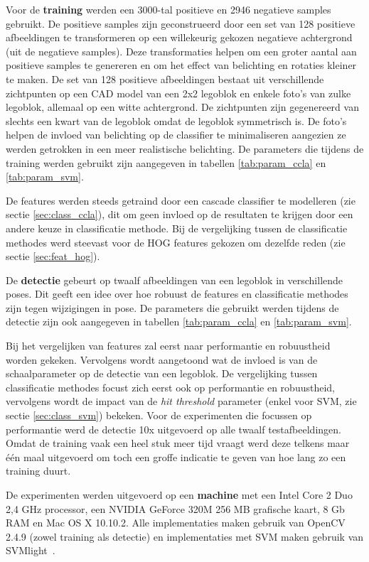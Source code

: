 Voor de \textbf{training} werden een 3000-tal positieve en 2946 negatieve samples gebruikt. De positieve samples zijn geconstrueerd door een set van 128 positieve afbeeldingen te transformeren op een willekeurig gekozen negatieve achtergrond (uit de negatieve samples). Deze transformaties helpen om een groter aantal aan positieve samples te genereren en om het effect van belichting en rotaties kleiner te maken. De set van 128 positieve afbeeldingen bestaat uit verschillende zichtpunten op een CAD model van een 2x2 legoblok en enkele foto's van zulke legoblok, allemaal op een witte achtergrond. De zichtpunten zijn gegenereerd van slechts een kwart van de legoblok omdat de legoblok symmetrisch is. De foto's helpen de invloed van belichting op de classifier te minimaliseren aangezien ze werden getrokken in een meer realistische belichting. De parameters die tijdens de training werden gebruikt zijn aangegeven in tabellen \ref{tab:param_ccla} en \ref{tab:param_svm}.

De features werden steeds getraind door een cascade classifier te modelleren (zie sectie \ref{sec:class_ccla}), dit om geen invloed op de resultaten te krijgen door een andere keuze in classificatie methode. Bij de vergelijking tussen de classificatie methodes werd steevast voor de HOG features gekozen om dezelfde reden (zie sectie \ref{sec:feat_hog}).

De \textbf{detectie} gebeurt op twaalf afbeeldingen van een legoblok in verschillende poses. Dit geeft een idee over hoe robuust de features  en classificatie methodes zijn tegen wijzigingen in pose. De parameters die gebruikt werden tijdens de detectie zijn ook aangegeven in tabellen \ref{tab:param_ccla} en \ref{tab:param_svm}.

Bij het vergelijken van features zal eerst naar performantie en robuustheid worden gekeken. Vervolgens wordt aangetoond wat de invloed is van de schaalparameter op de detectie van een legoblok. De vergelijking tussen classificatie methodes focust zich eerst ook op performantie en robuustheid, vervolgens wordt de impact van de \textit{hit threshold} parameter (enkel voor SVM, zie sectie \ref{sec:class_svm}) bekeken. Voor de experimenten die focussen op performantie werd de detectie 10x uitgevoerd op alle twaalf testafbeeldingen. Omdat de training vaak een heel stuk meer tijd vraagt werd deze telkens maar \'e\'en maal uitgevoerd om toch een groffe indicatie te geven van hoe lang zo een training duurt.

De experimenten werden uitgevoerd op een \textbf{machine} met een Intel Core 2 Duo 2,4 GHz processor, een NVIDIA GeForce 320M 256 MB grafische kaart, 8 Gb RAM en Mac OS X 10.10.2. Alle implementaties maken gebruik van OpenCV 2.4.9 (zowel training als detectie) en implementaties met SVM maken gebruik van SVMlight~\cite{joachims1999svmlight}.

